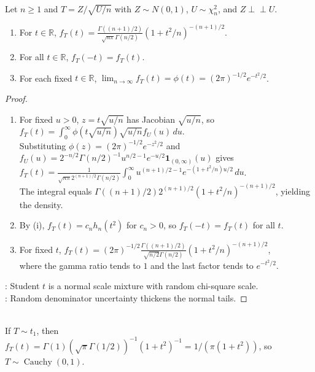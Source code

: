 \begin{proposition} \label{prop:student-t-density} \\
Let $n\geq1$ and $T=Z/\sqrt{U/n}$ with $Z\sim N(0,1)$, $U\sim\chi_n^2$, and $Z\perp\!\!\!\perp U$.
\begin{enumerate}[label=(\roman*)]
\setlength{\itemsep}{0pt}
\item For $t\in\mathbb{R}$, $f_T(t)=\frac{\Gamma((n+1)/2)}{\sqrt{n\pi}\Gamma(n/2)}(1+t^2/n)^{-(n+1)/2}$.
\item For all $t\in\mathbb{R}$, $f_T(-t)=f_T(t)$.
\item For each fixed $t\in\mathbb{R}$, $\lim_{n\to\infty}f_T(t)=\phi(t)=(2\pi)^{-1/2}e^{-t^2/2}$.
\end{enumerate}
\begin{proof}
\begin{enumerate}[label=(\roman*)]
\setlength{\itemsep}{0pt}
\item For fixed $u>0$, $z=t\sqrt{u/n}$ has Jacobian $\sqrt{u/n}$, so $f_T(t)=\int_0^\infty\phi(t\sqrt{u/n})\sqrt{u/n}f_U(u)\,du$.\\
Substituting $\phi(z)=(2\pi)^{-1/2}e^{-z^2/2}$ and $f_U(u)=2^{-n/2}\Gamma(n/2)^{-1}u^{n/2-1}e^{-u/2}\mathbf{1}_{(0,\infty)}(u)$ gives\\
$f_T(t)=\frac{1}{\sqrt{n\pi}2^{(n+1)/2}\Gamma(n/2)}\int_0^\infty u^{(n+1)/2-1}e^{-(1+t^2/n)u/2}\,du$.\\
The integral equals $\Gamma((n+1)/2)2^{(n+1)/2}(1+t^2/n)^{-(n+1)/2}$, yielding the density.
\item By (i), $f_T(t)=c_nh_n(t^2)$ for $c_n>0$, so $f_T(-t)=f_T(t)$ for all $t$.
\item For fixed $t$, $f_T(t)=(2\pi)^{-1/2}\frac{\Gamma((n+1)/2)}{\sqrt{n/2}\Gamma(n/2)}(1+t^2/n)^{-(n+1)/2}$,\\
where the gamma ratio tends to $1$ and the last factor tends to $e^{-t^2/2}$.
\end{enumerate}
: Student $t$ is a normal scale mixture with random chi-square scale.\\
: Random denominator uncertainty thickens the normal tails.
\end{proof}
\end{proposition}

\begin{example} \label{ex:t-one-is-cauchy} \\
If $T\sim t_1$, then $f_T(t)=\Gamma(1)(\sqrt{\pi}\Gamma(1/2))^{-1}(1+t^2)^{-1}=1/(\pi(1+t^2))$, so $T\sim\operatorname{Cauchy}(0,1)$.
\end{example}

